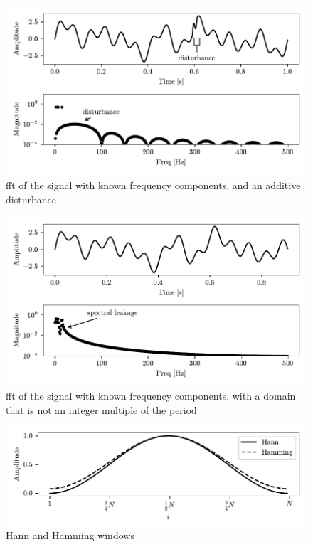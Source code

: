 \begin{figure}
    \centering
    \includegraphics[scale=1]{images/FeatureExtraction/FD_known_dist.pdf}
    \caption{\gls{fft} of the signal with known frequency components, and an additive disturbance}
    \label{fig:FD_known_dist}
\end{figure}

\begin{figure}
    \centering
    \includegraphics[scale=1]{images/FeatureExtraction/FD_known_outofsync.pdf}
    \caption{\gls{fft} of the signal with known frequency components, with a domain that is not an integer multiple of the period}
    \label{fig:FD_known_leackage}
\end{figure}

\begin{figure}
    \centering
    \includegraphics[scale=1]{images/FeatureExtraction/windows.pdf}
    \caption{Hann and Hamming windows}
    \label{fig:windows}
\end{figure} 


